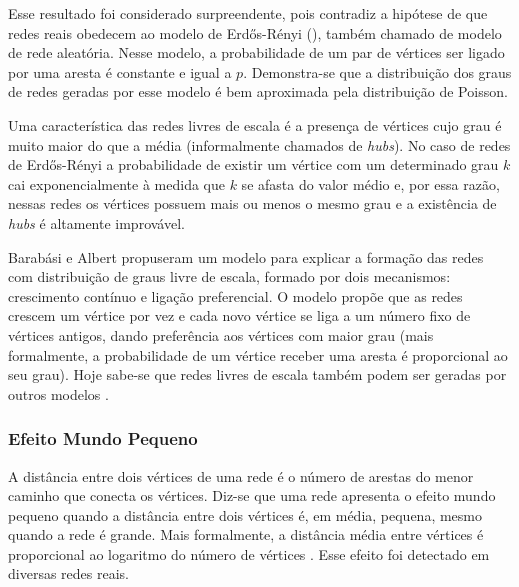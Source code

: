\documentclass{article}
\begin{document}
Esse resultado foi considerado surpreendente, pois contradiz a hipótese de que redes reais obedecem ao modelo de Erdős-Rényi (\citeyear{Erdos1959}), também chamado de modelo de rede aleatória. Nesse modelo, a probabilidade de um par de vértices ser ligado por uma aresta é constante e igual a $p$. Demonstra-se que a distribuição dos graus de redes geradas por esse modelo é bem aproximada pela distribuição de Poisson.

Uma característica das redes livres de escala é a presença de vértices cujo grau é muito maior do que a média (informalmente chamados de \textit{hubs}). No caso de redes de Erdős-Rényi a probabilidade de existir um vértice com um determinado grau $k$ cai exponencialmente à medida que $k$ se afasta do valor médio e, por essa razão, nessas redes os vértices possuem mais ou menos o mesmo grau e a existência de \textit{hubs} é altamente improvável.

Barabási e Albert propuseram um modelo para explicar a formação das redes com distribuição de graus livre de escala, formado por dois mecanismos: crescimento contínuo e ligação preferencial. O modelo propõe que as redes crescem um vértice por vez e cada novo vértice se liga a um número fixo de vértices antigos, dando preferência aos vértices com maior grau (mais formalmente, a probabilidade de um vértice receber uma aresta é proporcional ao seu grau). Hoje sabe-se que redes livres de escala também podem ser geradas por outros modelos \cite{Albert2000,Kumar2000,Aiello2000b,Dorogovtsev2002,Bollobas2003,Deo2005}.


\subsubsection{Efeito Mundo Pequeno}

A distância entre dois vértices de uma rede é o número de arestas do menor caminho que conecta os vértices. Diz-se que uma rede apresenta o efeito mundo pequeno quando a distância entre dois vértices é, em média, pequena, mesmo quando a rede é grande. Mais formalmente, a distância média entre vértices é proporcional ao logaritmo do número de vértices \cite{Watts1998}. Esse efeito foi detectado em diversas redes reais.
\end{document}
